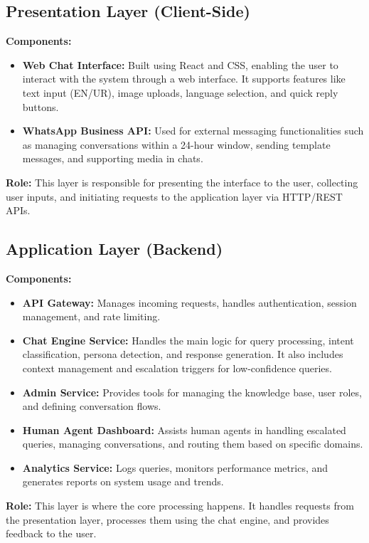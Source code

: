 \subsection{Presentation Layer (Client-Side)}

\textbf{Components:}
\begin{itemize}
    \item \textbf{Web Chat Interface:} Built using React and CSS, enabling the user to interact with the system through a web interface. It supports features like text input (EN/UR), image uploads, language selection, and quick reply buttons.
    \item \textbf{WhatsApp Business API:} Used for external messaging functionalities such as managing conversations within a 24-hour window, sending template messages, and supporting media in chats.
\end{itemize}

\textbf{Role:} This layer is responsible for presenting the interface to the user, collecting user inputs, and initiating requests to the application layer via HTTP/REST APIs.

\subsection{Application Layer (Backend)}

\textbf{Components:}
\begin{itemize}
    \item \textbf{API Gateway:} Manages incoming requests, handles authentication, session management, and rate limiting.
    \item \textbf{Chat Engine Service:} Handles the main logic for query processing, intent classification, persona detection, and response generation. It also includes context management and escalation triggers for low-confidence queries.
    \item \textbf{Admin Service:} Provides tools for managing the knowledge base, user roles, and defining conversation flows.
    \item \textbf{Human Agent Dashboard:} Assists human agents in handling escalated queries, managing conversations, and routing them based on specific domains.
    \item \textbf{Analytics Service:} Logs queries, monitors performance metrics, and generates reports on system usage and trends.
\end{itemize}

\textbf{Role:} This layer is where the core processing happens. It handles requests from the presentation layer, processes them using the chat engine, and provides feedback to the user.

